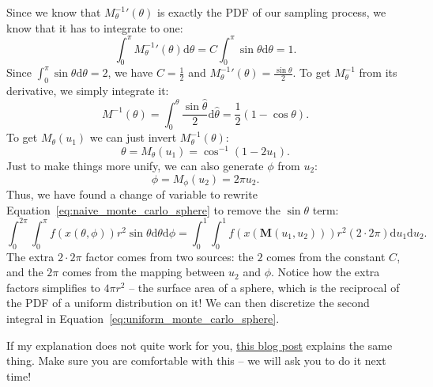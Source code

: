 Since we know that ${M_{\theta}^{-1}}'(\theta)$ is exactly the PDF of our sampling process, we know that it has to integrate to one:
\begin{equation}
\int_{0}^{\pi} {M_{\theta}^{-1}}'(\theta) \mathrm{d}\theta = C\int_{0}^{\pi} \sin\theta \mathrm{d}\theta = 1.
\label{eq:pdf_normalization}
\end{equation}
Since $\int_{0}^{\pi} \sin\theta \mathrm{d}\theta = 2$, we have $C = \frac{1}{2}$ and ${M_{\theta}^{-1}}'(\theta) = \frac{\sin\theta}{2}$. To get $M_{\theta}^{-1}$ from its derivative, we simply integrate it:
\begin{equation}
M^{-1}(\theta) = \int_{0}^{\theta} \frac{\sin\hat{\theta}}{2} \mathrm{d}\hat{\theta} = \frac{1}{2}\left(1 - \cos\theta\right).
\end{equation}
To get $M_{\theta}(u_1)$ we can just invert $M_{\theta}^{-1}(\theta)$:
\begin{equation}
\theta = M_{\theta}(u_1) = \cos^{-1}\left(1 - 2u_1\right).
\end{equation}
Just to make things more unify, we can also generate $\phi$ from $u_2$:
\begin{equation}
\phi = M_{\phi}(u_2) = 2\pi u_2.
\end{equation}
Thus, we have found a change of variable to rewrite Equation~\eqref{eq:naive_monte_carlo_sphere} to remove the $\sin\theta$ term:
\begin{equation}
    \int_{0}^{2\pi}\int_{0}^{\pi} f(x(\theta, \phi)) r^2 \sin\theta \mathrm{d}\theta \mathrm{d} \phi =
    \int_{0}^{1}\int_{0}^{1} f(x(\mathbf{M}(u_1, u_2))) r^2 (2 \cdot 2\pi) \mathrm{d}u_1 \mathrm{d}u_2.
    \label{eq:uniform_monte_carlo_sphere}
\end{equation}
The extra $2 \cdot 2\pi$ factor comes from two sources: the $2$ comes from the constant $C$, and the $2\pi$ comes from the mapping between $u_2$ and $\phi$. Notice how the extra factors simplifies to $4\pi r^2$ -- the surface area of a sphere, which is the reciprocal of the PDF of a uniform distribution on it! We can then discretize the second integral in Equation~\eqref{eq:uniform_monte_carlo_sphere}.

If my explanation does not quite work for you, \href{http://6degreesoffreedom.co/circle-random-sampling/}{this blog post} explains the same thing. Make sure you are comfortable with this -- we will ask you to do it next time!

